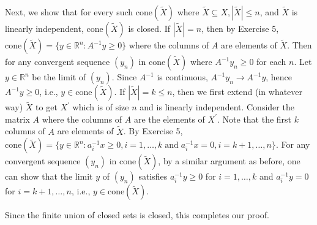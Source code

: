 \documentclass[11pt]{article}
\renewcommand{\leq}{\leqslant}
\renewcommand{\geq}{\geqslant}
\newcommand{\cone}{\mathrm{cone}}
\begin{document}
\begin{enumerate}[1)]
\begin{solution}
  Next, we show that for every such $\cone(\tilde{X})$ where $\tilde{X} \subseteq X, |\tilde{X}| \leq n$, and $\tilde{X}$ is linearly independent, $\cone(\tilde{X})$ is closed. 
  If $|\tilde{X}|=n$, then by Exercise 5, $\cone(\tilde{X}) = \{y\in \mathbb{R}^n: A^{-1}y\geq 0\}$ where the columns of $A$ are elements of $\tilde{X}$. Then for any convergent sequence $(y_n)$ in $\cone(\tilde{X})$ where $A^{-1}y_n \geq 0$ for each $n$. Let $y \in \mathbb{R}^n$ be the limit of $(y_n)$. Since $A^{-1}$ is continuous, $A^{-1}y_n \rightarrow A^{-1}y$, hence $A^{-1}y \geq 0$, i.e., $y \in \cone(\tilde{X})$.
  If $|\tilde{X}|=k\leq n$, then we first extend (in whatever way) $\tilde{X}$ to get $X^\prime$ which is of size $n$ and is linearly independent. Consider the matrix $A$ where the columns of $A$ are the elements of $X^\prime$. Note that the first $k$ columns of $A$ are elements of $\tilde{X}$. By Exercise 5, $\cone(\tilde{X}) = \{y\in \mathbb{R}^n: a_i^{-1}x \geq 0, i=1, \dots, k \;\text{and}\;a_i^{-1}x=0, i=k+1, \dots, n \}$. For any convergent sequence $(y_n)$ in $\cone(\tilde{X})$, by a similar argument as before, one can show that the limit $y$ of $(y_n)$ satisfies $a_i^{-1} y \geq 0$ for $i=1, \dots, k$ and $a_i^{-1} y = 0$ for $i=k+1, \dots, n$, i.e., $y \in \cone(\tilde{X})$. 

  Since the finite union of closed sets is closed, this completes our proof.
  
  \end{solution}


\end{enumerate}



  
\end{document}
